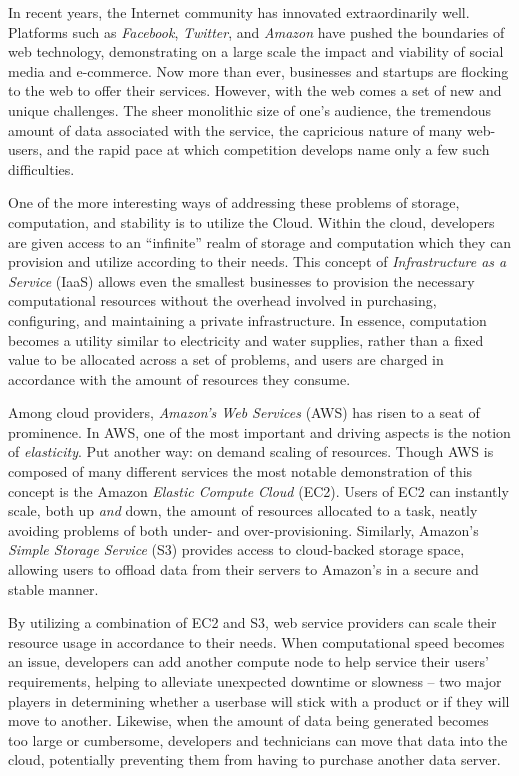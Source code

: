 In recent years, the Internet community has innovated extraordinarily well.
Platforms such as \emph{Facebook}, \emph{Twitter}, and \emph{Amazon} have
pushed the boundaries of web technology, demonstrating on a large scale the
impact and viability of social media and e-commerce. Now more than ever,
businesses and startups are flocking to the web to offer their services.
However, with the web comes a set of new and unique challenges. The sheer
monolithic size of one's audience, the tremendous amount of data associated
with the service, the capricious nature of many web-users, and the rapid pace
at which competition develops name only a few such difficulties.

One of the more interesting ways of addressing these problems of storage,
computation, and stability is to utilize the Cloud. Within the cloud,
developers are given access to an ``infinite'' realm of storage and computation
which they can provision and utilize according to their needs. This concept of
\emph{Infrastructure as a Service} (IaaS) allows even the smallest businesses
to provision the necessary computational resources without the overhead
involved in purchasing, configuring, and maintaining a private infrastructure.
In essence, computation becomes a utility similar to electricity and water
supplies, rather than a fixed value to be allocated across a set of problems,
and users are charged in accordance with the amount of resources they consume.

Among cloud providers, \emph{Amazon's Web Services} (AWS) has risen to a seat
of prominence. In AWS, one of the most important and driving aspects is the
notion of \emph{elasticity}. Put another way: on demand scaling of resources.
Though AWS is composed of many different services the most notable
demonstration of this concept is the Amazon \emph{Elastic Compute Cloud} (EC2).
Users of EC2 can instantly scale, both up \emph{and} down, the amount of
resources allocated to a task, neatly avoiding problems of both under- and
over-provisioning.  Similarly, Amazon's \emph{Simple Storage Service} (S3)
provides access to cloud-backed storage space, allowing users to offload data
from their servers to Amazon's in a secure and stable manner.

By utilizing a combination of EC2 and S3, web service providers can scale their
resource usage in accordance to their needs. When computational speed becomes
an issue, developers can add another compute node to help service their users'
requirements, helping to alleviate unexpected downtime or slowness -- two major
players in determining whether a userbase will stick with a product or if they
will move to another. Likewise, when the amount of data being generated becomes
too large or cumbersome, developers and technicians can move that data into the
cloud, potentially preventing them from having to purchase another data server.

